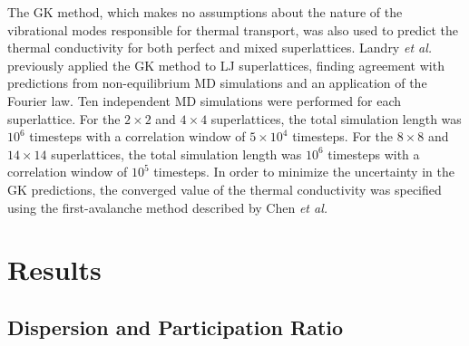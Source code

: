 \documentclass[aps,prb,preprint,preprintnumbers,amsmath,amssymb,floatfix,superscriptaddress]{revtex4}
\begin{document}
The GK method, which makes no assumptions about the nature of the vibrational modes responsible for thermal transport, was also used to predict the thermal conductivity for both perfect and mixed superlattices. Landry \textit{et al.} previously applied the GK method to LJ superlattices, finding agreement with predictions from non-equilibrium MD simulations and an application of the Fourier law.\cite{PhysRevB.79.075316}
Ten independent MD simulations were performed for each superlattice. For the $2 \times 2$ and $4 \times 4$ superlattices, the total  simulation length was $10^6$ timesteps with a correlation window of $5\times 10^4$ timesteps.  For the $8 \times 8$ and $14 \times 14$ superlattices, the total  simulation length was $10^6$ timesteps with a correlation window of $10^5$ timesteps. In order to minimize the uncertainty in the GK predictions, the converged value of the thermal conductivity was specified using the first-avalanche method described by Chen \textit{et al.} \cite{Chen20102392}


\section{Results}\label{SEC:results}
\subsection{Dispersion and Participation Ratio}
\end{document}
